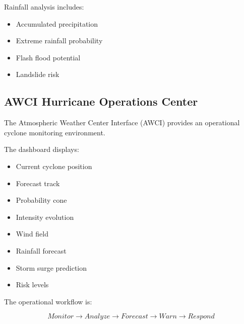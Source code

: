 Rainfall analysis includes:

\begin{itemize}

\item Accumulated precipitation

\item Extreme rainfall probability

\item Flash flood potential

\item Landslide risk

\end{itemize}



\subsection{AWCI Hurricane Operations Center}

The Atmospheric Weather Center Interface (AWCI) provides an operational
cyclone monitoring environment.

The dashboard displays:

\begin{itemize}

\item Current cyclone position

\item Forecast track

\item Probability cone

\item Intensity evolution

\item Wind field

\item Rainfall forecast

\item Storm surge prediction

\item Risk levels

\end{itemize}


The operational workflow is:

\[
Monitor
\rightarrow
Analyze
\rightarrow
Forecast
\rightarrow
Warn
\rightarrow
Respond
\]



